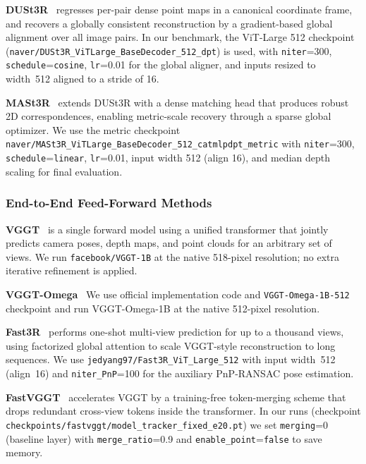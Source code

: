\textbf{DUSt3R}~\citep{wang2024dust3r} regresses per-pair dense point maps in a canonical coordinate frame, and recovers a globally consistent reconstruction by a gradient-based global alignment over all image pairs.
%
In our benchmark, the ViT-Large 512 checkpoint (\texttt{naver/DUSt3R\_ViTLarge\_BaseDecoder\_512\_dpt}) is used, with \texttt{niter}=300, \texttt{schedule}=\texttt{cosine}, \texttt{lr}=0.01 for the global aligner, and inputs resized to width~512 aligned to a stride of 16.

\textbf{MASt3R}~\citep{leroy2024mast3r} extends DUSt3R with a dense matching head that produces robust 2D correspondences, enabling metric-scale recovery through a sparse global optimizer. We use the metric checkpoint \texttt{naver/MASt3R\_ViTLarge\_BaseDecoder\_512\_catmlpdpt\_metric} with \texttt{niter}=300, \texttt{schedule}=\texttt{linear}, \texttt{lr}=0.01, input width 512 (align 16), and median depth scaling for final evaluation.

\subsubsection{End-to-End Feed-Forward Methods}

\textbf{VGGT}~\citep{wang2025vggt} is a single forward model using a unified transformer that jointly predicts camera poses, depth maps, and point clouds for an arbitrary set of views.
%
We run \texttt{facebook/VGGT-1B} at the native 518-pixel resolution; no extra iterative refinement is applied.

\textbf{VGGT-Omega}~\citep{wang2026vggtomega} We use official implementation code and \texttt{VGGT-Omega-1B-512} checkpoint and run VGGT-Omega-1B at the native 512-pixel resolution. 

\textbf{Fast3R}~\citep{yang2025fast3r} performs one-shot multi-view prediction for up to a thousand views, using factorized global attention to scale VGGT-style reconstruction to long sequences.
%
We use \texttt{jedyang97/Fast3R\_ViT\_Large\_512} with input width~512 (align~16) and \texttt{niter\_PnP}=100 for the auxiliary PnP-RANSAC pose estimation.

\textbf{FastVGGT}~\citep{shen2025fastvggt} accelerates VGGT by a training-free token-merging scheme that drops redundant cross-view tokens inside the transformer.
%
In our runs (checkpoint \texttt{checkpoints/fastvggt/model\_tracker\_fixed\_e20.pt}) we set \texttt{merging}=0 (baseline layer) with \texttt{merge\_ratio}=0.9 and \texttt{enable\_point}=\texttt{false} to save memory.

